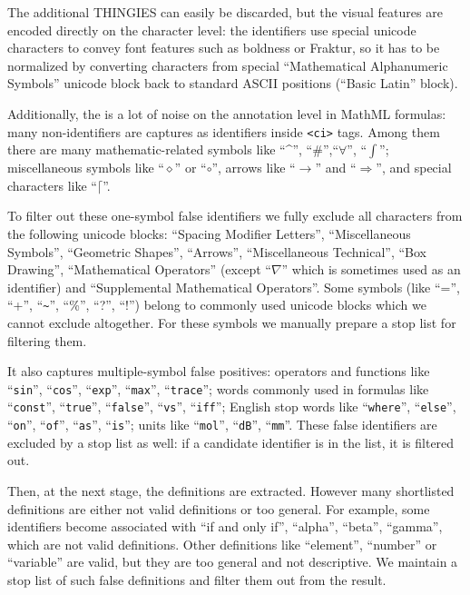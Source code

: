 The additional THINGIES can easily be discarded, but the visual features are 
encoded directly on the character level: the identifiers use special unicode 
characters to convey font features such as boldness or Fraktur,
so it has to be normalized by converting characters
from special ``Mathematical Alphanumeric Symbols'' unicode block
back to standard ASCII positions (``Basic Latin'' block).

Additionally, the is a lot of noise on the annotation level in MathML formulas: 
many non-identifiers are captures as identifiers inside \verb|<ci>| tags. Among 
them there are many mathematic-related symbols
like ``\textasciicircum'', ``\#'',``$\forall$'', ``$\int$''; 
miscellaneous symbols like ``$\diamond$'' or
``$\circ$'', arrows like ``$\to$'' and ``$\Rightarrow$'', and special characters like
``$\lceil$''.

To filter out these one-symbol false identifiers we fully exclude all characters from 
the following unicode blocks: ``Spacing Modifier Letters'', ``Miscellaneous Symbols'', 
``Geometric Shapes'', ``Arrows'', ``Miscellaneous Technical'', ``Box Drawing'', 
``Mathematical Operators'' (except ``$\nabla$'' which is sometimes used as an identifier)
and ``Supplemental Mathematical Operators''.
Some symbols (like ``='', ``+'', ``\verb|~|'', ``\%'', ``?'', ``!'')
belong to commonly used unicode blocks which we cannot exclude altogether. 
For these symbols we manually prepare a stop list for filtering them.

It also captures multiple-symbol false positives: operators and functions
like ``\texttt{sin}'', ``\texttt{cos}'', ``\texttt{exp}'', ``\texttt{max}'', ``\texttt{trace}''; 
words commonly used in formulas like ``\texttt{const}'', ``\texttt{true}'', ``\texttt{false}'',
``\texttt{vs}'', ``\texttt{iff}''; English stop words like ``\texttt{where}'', ``\texttt{else}'',
``\texttt{on}'', ``\texttt{of}'', ``\texttt{as}'', ``\texttt{is}''; 
units like ``\texttt{mol}'', ``\texttt{dB}'', ``\texttt{mm}''.
These false identifiers are excluded by a stop list as well: if a
candidate identifier is in the list, it is filtered out.


Then, at the next stage, the definitions are extracted. However many 
shortlisted definitions are either not valid definitions or too general. 
For example, some identifiers become associated with ``if and only if'', 
``alpha'', ``beta'', ``gamma'', which are not valid definitions. Other definitions
like ``element'', ``number'' or ``variable'' are valid, but 
they are too general and not descriptive. We maintain a stop list of such 
false definitions and filter them out from the result. 



